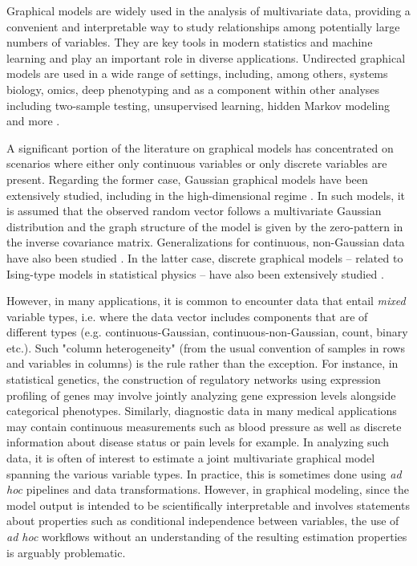 Graphical models are widely used in the analysis of multivariate data, providing a convenient and interpretable way to study relationships among potentially large numbers of variables. They are key tools in modern statistics and machine learning and play an important role in diverse applications. Undirected graphical models are used in a wide range of settings, including, among others, systems biology, omics, deep phenotyping \citep[see, e.g.][]{dobra2004, Finegold11, monti2014}
and as a component within other analyses including two-sample testing, unsupervised learning, hidden Markov modeling and more  \citep[examples include][]{wei2007,verzelen2009,stadler2013, stadler2015,perrakis2021}.

A significant portion of the literature on graphical models has concentrated on scenarios where either only continuous variables or only discrete variables are present.
Regarding the former case, Gaussian graphical models have been extensively studied, including in the high-dimensional regime \citep[see among others][]{Meinshausen06, Friedman08, Banerjee08, Lam09, Yuan10, Ravikumar11, Cai11}. In such models, it is assumed that the observed random vector follows a multivariate Gaussian distribution and the graph structure of the model is given by the zero-pattern in the inverse covariance matrix. Generalizations for continuous, non-Gaussian data have also been studied \citep{Miyamura06, Liu09, Finegold11}. In the latter case, discrete graphical models -- related to Ising-type models in statistical physics -- have also been extensively studied \citep[see e.g.][]{wainwright2006, ravikumar2010}.

However, in many applications, it is common to encounter data that entail \textit{mixed} variable types, i.e. where the data vector includes components that are of different types (e.g. continuous-Gaussian, continuous-non-Gaussian, count, binary etc.). Such "column heterogeneity" (from the usual convention of samples in rows and variables in columns) is the rule rather than the exception.
For instance, in statistical genetics, the construction of regulatory networks using expression profiling of genes may involve jointly analyzing gene expression levels alongside categorical phenotypes. Similarly, diagnostic data in many medical applications may contain continuous measurements such as blood pressure as well as discrete information about disease status or pain levels for example.
In analyzing such data, it is often of interest to estimate a joint multivariate graphical model spanning the various variable types. In practice, this is sometimes done using \textit{ad hoc} pipelines and data transformations. However, in graphical modeling, since the model output is intended to be scientifically interpretable and involves statements about properties such as conditional independence between variables, the use of \textit{ad hoc} workflows without an understanding of the resulting estimation properties is arguably problematic.

